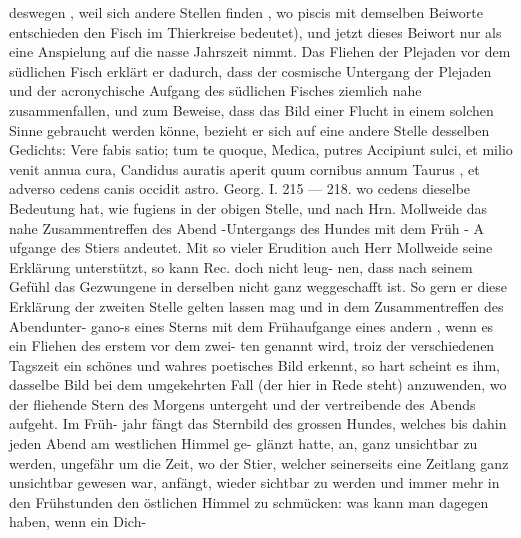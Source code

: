 \documentclass[12pt,a4paper]{article}
\begin{document}
deswegen , weil sich andere Stellen finden , wo piscis mit demselben Beiworte entschieden den Fisch\newline
im Thierkreise bedeutet), und jetzt dieses Beiwort nur als eine Anspielung auf die nasse Jahrszeit nimmt.\newline
Das Fliehen der Plejaden vor dem südlichen Fisch erklärt er dadurch, dass der cosmische Untergang\newline
der Plejaden und der acronychische Aufgang des südlichen Fisches ziemlich nahe zusammenfallen, und\newline
zum Beweise, dass das Bild einer Flucht in einem solchen Sinne gebraucht werden könne, bezieht er\newline
sich auf eine andere Stelle desselben Gedichts:\newline
Vere fabis satio; tum te quoque, Medica, putres\newline
Accipiunt sulci, et milio venit annua cura,\newline
Candidus auratis aperit quum cornibus annum\newline
Taurus , et adverso cedens canis occidit astro.\newline
Georg. I. 215 --- 218.\newline
wo cedens dieselbe Bedeutung hat, wie fugiens in der obigen Stelle, und nach Hrn. Mollweide das\newline
nahe Zusammentreffen des Abend -Untergangs des Hundes mit dem Früh - A ufgange des Stiers andeutet.\newline
Mit so vieler Erudition auch Herr Mollweide seine Erklärung unterstützt, so kann Rec. doch nicht leug-\newline
nen, dass nach seinem Gefühl das Gezwungene in derselben nicht ganz weggeschafft ist. So gern er\newline
diese Erklärung der zweiten Stelle gelten lassen mag und in dem Zusammentreffen des Abendunter-\newline
gano-s eines Sterns mit dem Frühaufgange eines andern , wenn es ein Fliehen des erstem vor dem zwei-\newline
ten genannt wird, troiz der verschiedenen Tagszeit ein schönes und wahres poetisches Bild erkennt, so\newline
hart scheint es ihm, dasselbe Bild bei dem umgekehrten Fall (der hier in Rede steht) anzuwenden,\newline
wo der fliehende Stern des Morgens untergeht und der vertreibende des Abends aufgeht. Im Früh-\newline
jahr fängt das Sternbild des grossen Hundes, welches bis dahin jeden Abend am westlichen Himmel ge-\newline
glänzt hatte, an, ganz unsichtbar zu werden, ungefähr um die Zeit, wo der Stier, welcher seinerseits\newline
eine Zeitlang ganz unsichtbar gewesen war, anfängt, wieder sichtbar zu werden und immer mehr in\newline
den Frühstunden den östlichen Himmel zu schmücken: was kann man dagegen haben, wenn ein Dich-\newline
\end{document}
